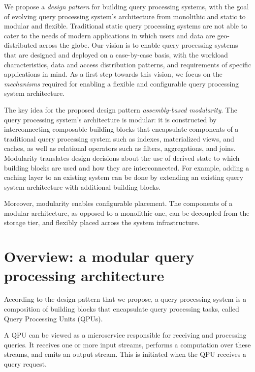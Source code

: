 
We propose a \textit{design pattern} for building query processing systems,
with the goal of evolving query processing system's architecture from monolithic and static to modular and flexible.
Traditional static query processing systems are not able to cater to the needs of modern applications in which users and
data are geo-distributed across the globe.
Our vision is to enable query processing systems that are designed and deployed on a case-by-case basis,
with the workload characteristics, data and access distribution patterns, and requirements of specific applications in
mind.
As a first step towards this vision, we focus on the \textit{mechanisms} required for enabling a flexible and configurable
query processing system architecture.

\medskip

The key idea for the proposed design pattern \textit{assembly-based modularity}.
The query processing system's architecture is modular:
it is constructed by interconnecting composable building blocks
that encapsulate components of a traditional query processing system such as indexes, materialized views,
and caches, as well as relational operators such as filters, aggregations, and joins.
Modularity translates design decisions about the use of derived state to which building blocks are used and how they are
interconnected.
For example, adding a caching layer to an existing system can be done by extending an existing query system architecture
with additional building blocks.

Moreover, modularity enables configurable placement.
The components of a modular architecture, as opposed to a monolithic one,
can be decoupled from the storage tier, and flexibly placed across the system infrastructure.


\section{Overview: a modular query processing architecture}

According to the design pattern that we propose,
a query processing system is a composition of building blocks that encapsulate query processing tasks, called
Query Processing Units (QPUs).

A QPU can be viewed as a microservice responsible for receiving and processing queries.
It receives one or more input streams, performs a computation over these streams, and emits an output stream.
This is initiated when the QPU receives a query request.

